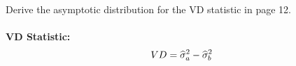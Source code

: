 Derive the asymptotic distribution for the VD statistic in page 12. \\\\
\textbf{VD Statistic:}
$$VD = \widehat{\sigma}_a^2 - \widehat{\sigma}_b^2$$ 
